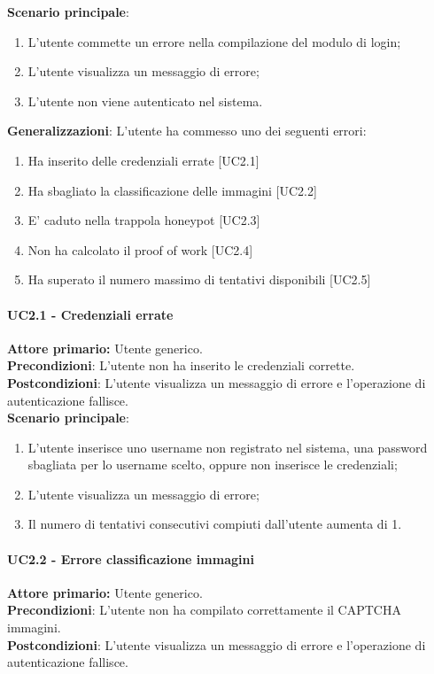 \textbf{Scenario principale}:
\begin{enumerate}
   \item L’utente commette un errore nella compilazione del modulo di login;
   \item L'utente visualizza un messaggio di errore;
   \item L'utente non viene autenticato nel sistema.
\end{enumerate}

\textbf{Generalizzazioni}: L'utente ha commesso uno dei seguenti errori:
\begin{enumerate}
	\item Ha inserito delle credenziali errate [UC2.1]
	\item Ha sbagliato la classificazione delle immagini [UC2.2]
	\item E' caduto nella trappola honeypot [UC2.3]
	\item Non ha calcolato il proof of work [UC2.4]
	\item Ha superato il numero massimo di tentativi disponibili [UC2.5]
\end{enumerate}

\paragraph{UC2.1 - Credenziali errate}
\textbf{Attore primario:} Utente generico.\\
\textbf{Precondizioni}: L’utente non ha inserito le credenziali corrette.\\
\textbf{Postcondizioni}: L’utente visualizza un messaggio di errore e l’operazione di autenticazione fallisce.\\

\textbf{Scenario principale}:
\begin{enumerate}
    \item L'utente inserisce uno username non registrato nel sistema, una password sbagliata per lo username scelto, oppure non inserisce le credenziali;
	\item L’utente visualizza un messaggio di errore;
	\item Il numero di tentativi consecutivi compiuti dall’utente aumenta di 1.
\end{enumerate}

\paragraph{UC2.2 - Errore classificazione immagini}
\textbf{Attore primario:} Utente generico.\\
    \textbf{Precondizioni}: L’utente non ha compilato correttamente il CAPTCHA immagini.\\
\textbf{Postcondizioni}: L’utente visualizza un messaggio di errore e l’operazione di autenticazione fallisce.\\

